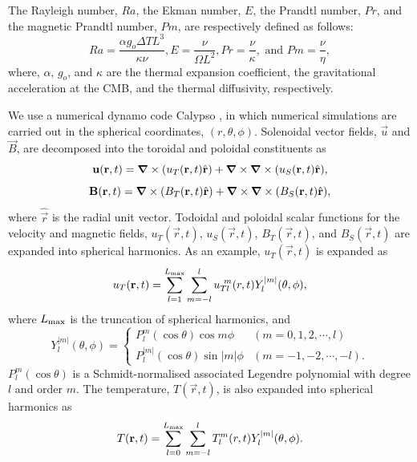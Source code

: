 The Rayleigh number, $Ra$, the Ekman number, $E$, the Prandtl number, $Pr$, and the magnetic Prandtl number, $Pm$, are respectively defined as follows:
%
\begin{equation}
Ra = \displaystyle{ \frac{\alpha g_o \Delta T L^{3}}{ \kappa \nu} }, 
E  = \displaystyle{ \frac{\nu}{\Omega L^{2}} },
Pr = \displaystyle{ \frac{\nu}{\kappa} }, 
\mbox{ and }
Pm = \displaystyle{ \frac{\nu}{\eta} },
\label{eq:dimensionless}
\end{equation}
%
where, $\alpha$, $g_o$, and $\kappa$ are the thermal expansion coefficient, the gravitational acceleration at the CMB, and the thermal diffusivity, respectively.

We use a numerical dynamo code Calypso \citep{Kemo:2014}, in which numerical simulations are carried out in the spherical coordinates, $(r, \theta, \phi)$.
Solenoidal vector fields, $\vec{u}$ and $\vec{B}$, are decomposed into the toroidal and poloidal constituents as
%
\begin{equation}
\vec{u}(\vec{r}, t) = \bnabla \times (u_T (\vec{r}, t) \hat{\vec{r}} ) + \bnabla \times \bnabla \times (u_S (\vec{r}, t) \hat{\vec{r}} ) ,
\label{eq:u_uT_uS}
\end{equation}
%
\begin{equation}
\vec{B}(\vec{r}, t) = \bnabla \times (B_T (\vec{r}, t) \hat{\vec{r}} ) + \bnabla \times \bnabla \times (B_S (\vec{r}, t) \hat{\vec{r}} ) ,
\label{eq:B_BT_BS}
\end{equation}
%
where $\hat{\vec{r}}$ is the radial unit vector.
Todoidal and poloidal scalar functions for the velocity and magnetic fields, $u_T(\vec{r}, t)$, $u_S(\vec{r}, t)$, $B_T(\vec{r}, t)$, and $B_S(\vec{r}, t)$ are expanded into spherical harmonics.
As an example, $u_T (\vec{r}, t)$ is expanded as
%
\begin{equation}
u_T (\vec{r}, t) = \sum_{l = 1}^{L_{\rm max}} \sum_{m=-l}^{l} u_{T l}^{\ m} (r, t) Y_l^{|m|} (\theta, \phi) ,
\label{eq:uT_Ylm}
\end{equation}
%
where $L_{\rm max}$ is the truncation of spherical harmonics, and
%
\begin{equation}
Y_l^{|m|} (\theta, \phi) = \left\{
 \begin{array}{ll}
 P_l^m(\cos\theta)\cos m\phi & (m = 0, 1, 2, \cdots, l)
 \\
 P_l^{|m|}(\cos\theta)\sin |m|\phi & (m = -1, -2, \cdots, -l) .
 \end{array}
\right.
\label{eq:def_of_Ylm}
\end{equation}
%
$P_l^m(\cos\theta)$ is a Schmidt-normalised associated Legendre polynomial with degree $l$ and order $m$.
The temperature, $T(\vec{r}, t)$, is also expanded into spherical harmonics as
%
\begin{equation}
T (\vec{r}, t) = \sum_{l = 0}^{L_{\rm max}} \sum_{m=-l}^{l} T_l^m(r, t) Y_l^{|m|} (\theta, \phi) .
\label{eq:T_Ylm}
\end{equation}
%


